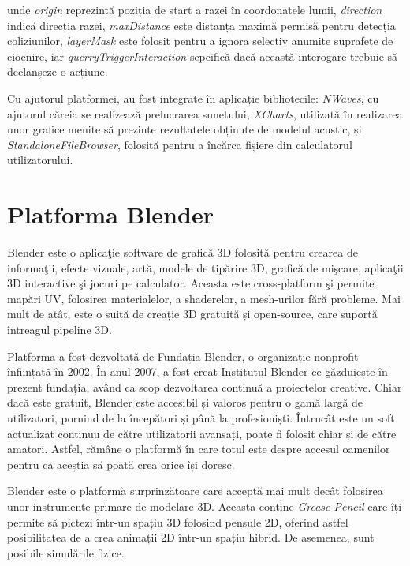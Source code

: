 	\noindent unde \textit{origin} reprezintă poziția de start a razei în coordonatele lumii, \textit{direction} indică direcția razei, \textit{maxDistance} este distanța maximă permisă pentru detecția coliziunilor, \textit{layerMask} este folosit pentru a ignora selectiv anumite suprafețe de ciocnire, iar \textit{querryTriggerInteraction} sepcifică dacă această interogare trebuie să declanșeze o acțiune.
	
	Cu ajutorul platformei, au fost integrate în aplicație bibliotecile: \textit{NWaves}, cu ajutorul căreia se realizează prelucrarea sunetului, \textit{XCharts}, utilizată în realizarea unor grafice menite să prezinte rezultatele obținute de modelul acustic, și \textit{StandaloneFileBrowser}, folosită pentru a încărca fișiere din calculatorul utilizatorului.
	
\section{Platforma Blender}
	
	Blender este o aplica\c{t}ie software de grafic\u{a} 3D folosit\u{a} pentru crearea de informa\c{t}ii, efecte vizuale, art\u{a}, modele de tip\u{a}rire 3D, grafic\u{a} de mi\c{s}care, aplica\c{t}ii 3D interactive \c{s}i jocuri pe calculator. Aceasta este cross-platform \c{s}i permite map\u{a}ri UV, folosirea materialelor, a shaderelor, a mesh-urilor f\u{a}r\u{a} probleme. Mai mult de atât, este o suită de creație 3D gratuită și open-source, care suportă întreagul pipeline 3D.
	
	Platforma a fost dezvoltată de Fundația Blender, o organizație nonprofit înființată în 2002. În anul 2007, a fost creat Institutul Blender ce găzduiește în prezent fundația, având ca scop dezvoltarea continuă a proiectelor creative. Chiar dacă este gratuit, Blender este accesibil și valoros pentru o gamă largă de utilizatori, pornind de la începători și până la profesioniști. Întrucât este un soft actualizat continuu de către utilizatorii avansați, poate fi folosit chiar și de către amatori. Astfel, rămâne o platformă în care totul este despre accesul oamenilor pentru ca aceștia să poată crea orice își doresc.
	
	Blender este o platformă surprinzătoare care acceptă mai mult decât folosirea unor instrumente primare de modelare 3D. Aceasta conține  \textit{Grease Pencil} care îți permite să pictezi într-un spațiu 3D folosind pensule 2D, oferind astfel posibilitatea de a crea animații 2D într-un spațiu hibrid. De asemenea, sunt posibile simulările fizice.
	
